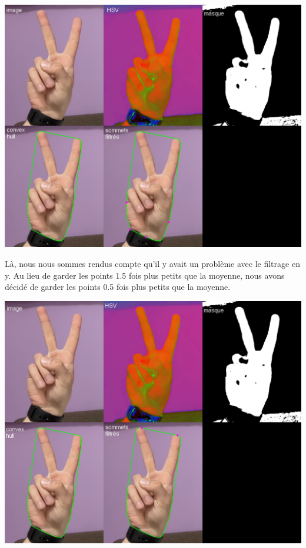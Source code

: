 \documentclass[11pt]{article}
\begin{document}
\begin{center}
    \includegraphics[width=\textwidth]{images/res_2_convex_hull_filter_1_y_2_x.png}
    \label{fig:res_2_convex_hull_filter_1_y_2_x}
\end{center}

Là, nous nous sommes rendus compte qu'il y avait un problème avec le filtrage en y. Au lieu de garder les points 1.5 fois plus petits que la moyenne, nous avons décidé de garder les points 0.5 fois plus petits que la moyenne. \bigbreak

\begin{center}
    \includegraphics[width=\textwidth]{images/res_2_convex_hull_filter_2_y_2_x.png}
    \label{fig:res_2_convex_hull_filter_2_y_2_x}
\end{center}
\end{document}

